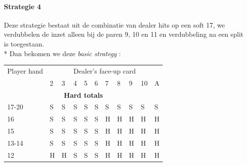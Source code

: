 \documentclass[conference]{IEEEtran}
\begin{document}
\newpage

\paragraph{Strategie 4}

Deze strategie bestaat uit de combinatie van dealer hits op een soft 17, we verdubbelen de inzet alleen bij de paren 9, 10 en 11 en verdubbeling na een split is toegestaan.\\*
Dan bekomen we deze \textit{basic strategy} :

\begin{table}[ht]
\tiny
\centering
\begin{tabular}{|l|l|l|l|l|l|l|l|l|l|l|}
\hline

{Player hand} & \multicolumn{10}{c|}{Dealer's face-up card}     \\ \cline{2-11} 
                             & 2 & 3 & 4 & 5 & 6 & 7 & 8 & 9 & 10 & A \\ \hline
\multicolumn{11}{|c|}{\textbf{Hard totals}}                           \\ \hline
17-20       								 & \cellcolor{red!75}S & \cellcolor{red!75}S & \cellcolor{red!75}S & \cellcolor{red!75}S & \cellcolor{red!75}S & \cellcolor{red!75}S & \cellcolor{red!75}S & \cellcolor{red!75}S & \cellcolor{red!75}S & \cellcolor{red!75}S  \\ \hline
16                           & \cellcolor{red!75}S & \cellcolor{red!75}S & \cellcolor{red!75}S & \cellcolor{red!75}S & \cellcolor{red!75}S & \cellcolor{green!50}H & \cellcolor{green!50}H & \cellcolor{green!50}H & \cellcolor{green!50}H & \cellcolor{green!50}H  \\ \hline
15                           & \cellcolor{red!75}S & \cellcolor{red!75}S & \cellcolor{red!75}S & \cellcolor{red!75}S & \cellcolor{red!75}S & \cellcolor{green!50}H & \cellcolor{green!50}H & \cellcolor{green!50}H & \cellcolor{green!50}H & \cellcolor{green!50}H  \\ \hline
13-14                        & \cellcolor{red!75}S & \cellcolor{red!75}S & \cellcolor{red!75}S & \cellcolor{red!75}S & \cellcolor{red!75}S & \cellcolor{green!50}H & \cellcolor{green!50}H & \cellcolor{green!50}H & \cellcolor{green!50}H & \cellcolor{green!50}H  \\ \hline
12                           & \cellcolor{green!50}H & \cellcolor{green!50}H & \cellcolor{red!75}S & \cellcolor{red!75}S & \cellcolor{red!75}S & \cellcolor{green!50}H & \cellcolor{green!50}H & \cellcolor{green!50}H & \cellcolor{green!50}H & \cellcolor{green!50}H  \\ \hline

\end{tabular}
\end{table}
\end{document}

